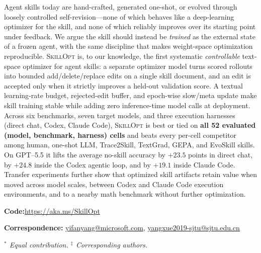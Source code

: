\documentclass{llmxive}
\providecommand{\ourmethod}{\textsc{SkillOpt}\xspace}
\providecommand{\msftmetalabel}[1]{{\msftsans\small\bfseries #1:}\hspace{0.35em}}
\begin{document}
\vspace{0.45em}
\begin{msfttitlebox}



\nohyphens

Agent skills today are hand-crafted, generated one-shot, or evolved through loosely controlled self-revision---none of which behaves like a deep-learning optimizer for the skill, and none of which reliably improves over its starting point under feedback. We argue the skill should instead be \emph{trained} as the external state of a frozen agent, with the same discipline that makes weight-space optimization reproducible. \ourmethod{} is, to our knowledge, the first systematic \emph{controllable} text-space optimizer for agent skills: a separate optimizer model turns scored rollouts into bounded add/delete/replace edits on a single skill document, and an edit is accepted only when it strictly improves a held-out validation score. A textual learning-rate budget, rejected-edit buffer, and epoch-wise slow/meta update make skill training stable while adding zero inference-time model calls at deployment. Across six benchmarks, seven target models, and three execution harnesses (direct chat, Codex, Claude Code), \ourmethod{} is best or tied on \textbf{all 52 evaluated (model, benchmark, harness) cells} and beats every per-cell competitor among human, one-shot LLM, Trace2Skill, TextGrad, GEPA, and EvoSkill skills. On GPT--5.5 it lifts the average no-skill accuracy by $\mathbf{+23.5}$ points in direct chat, by $+24.8$ inside the Codex agentic loop, and by $+19.1$ inside Claude Code. Transfer experiments further show that optimized skill artifacts retain value when moved across model scales, between Codex and Claude Code execution environments, and to a nearby math benchmark without further optimization.


\vspace{0.14cm}
{\small
{\msftmetalabel{Code}\href{https://aka.ms/SkillOpt}{https://aka.ms/SkillOpt}\par}
{\msftmetalabel{Correspondence}
\href{mailto:yifanyang@microsoft.com}{yifanyang@microsoft.com},
\href{mailto:yangxue2019-sjtu@sjtu.edu.cn}{yangxue2019-sjtu@sjtu.edu.cn}\par}
}
\vspace{0.08cm}
{\footnotesize\rmfamily\itshape
$^{*}$ Equal contribution. \quad $^{\ddagger}$ Corresponding authors.\par
}
\end{msfttitlebox}
\end{document}
